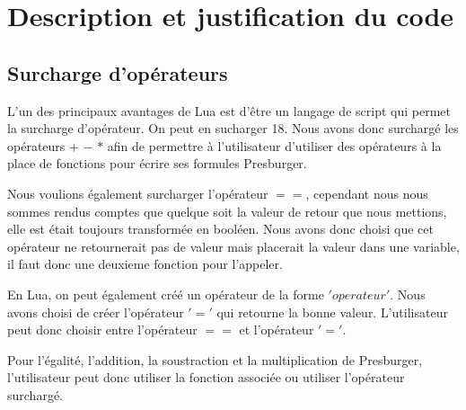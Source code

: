 \section{Description et justification du code}

\subsection{Surcharge d'opérateurs}

L'un des principaux avantages de Lua est d'être un langage de script qui permet la surcharge d'opérateur. On peut en sucharger 18. Nous avons donc surchargé les opérateurs $+$ $-$ $*$ afin de permettre à l'utilisateur d'utiliser des opérateurs à la place de fonctions pour écrire ses formules Presburger.\par
Nous voulions également surcharger l'opérateur $==$, cependant nous nous sommes rendus comptes que quelque soit la valeur de retour que nous mettions, elle est était toujours transformée en booléen.
Nous avons donc choisi que cet opérateur ne retournerait pas de valeur mais placerait la valeur dans une variable, il faut donc une deuxieme fonction pour l'appeler.\par
En Lua, on peut également créé un opérateur de la forme $'operateur'$. Nous avons choisi de créer l'opérateur $'='$ qui retourne la bonne valeur. L'utilisateur peut donc choisir entre l'opérateur $==$ et l'opérateur $'='$.\par
Pour l'égalité, l'addition, la soustraction et la multiplication de Presburger, l'utilisateur peut donc utiliser la fonction associée ou utiliser l'opérateur surchargé.
